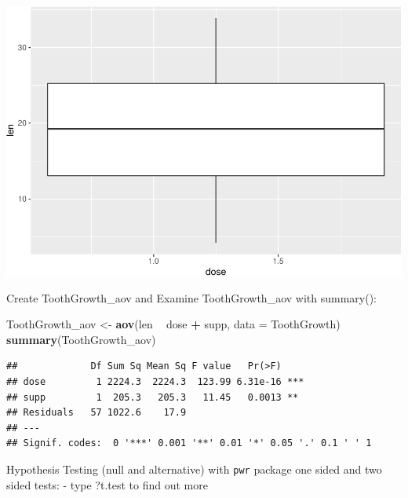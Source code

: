 \documentclass[]{book}
\newenvironment{Shaded}{\begin{snugshade}}{\end{snugshade}}
\newcommand{\CommentTok}[1]{\textcolor[rgb]{0.56,0.35,0.01}{\textit{#1}}}
\newcommand{\DataTypeTok}[1]{\textcolor[rgb]{0.13,0.29,0.53}{#1}}
\newcommand{\DecValTok}[1]{\textcolor[rgb]{0.00,0.00,0.81}{#1}}
\newcommand{\KeywordTok}[1]{\textcolor[rgb]{0.13,0.29,0.53}{\textbf{#1}}}
\newcommand{\NormalTok}[1]{#1}
\newcommand{\OperatorTok}[1]{\textcolor[rgb]{0.81,0.36,0.00}{\textbf{#1}}}
\newcommand{\StringTok}[1]{\textcolor[rgb]{0.31,0.60,0.02}{#1}}
\begin{document}
\includegraphics{code4stem_files/figure-latex/Visualize-1.pdf}

Create ToothGrowth\_aov and
Examine ToothGrowth\_aov with summary():

\begin{Shaded}
\begin{Highlighting}[]
\NormalTok{ToothGrowth_aov <-}\StringTok{ }\KeywordTok{aov}\NormalTok{(len }\OperatorTok{~}\StringTok{ }\NormalTok{dose }\OperatorTok{+}\StringTok{ }\NormalTok{supp, }\DataTypeTok{data =}\NormalTok{ ToothGrowth)}
\KeywordTok{summary}\NormalTok{(ToothGrowth_aov)}
\end{Highlighting}
\end{Shaded}

\begin{verbatim}
##             Df Sum Sq Mean Sq F value   Pr(>F)    
## dose         1 2224.3  2224.3  123.99 6.31e-16 ***
## supp         1  205.3   205.3   11.45   0.0013 ** 
## Residuals   57 1022.6    17.9                     
## ---
## Signif. codes:  0 '***' 0.001 '**' 0.01 '*' 0.05 '.' 0.1 ' ' 1
\end{verbatim}

Hypothesis Testing (null and alternative) with \texttt{pwr} package
one sided and two sided tests:
- type ?t.test to find out more

\begin{Shaded}
\end{Shaded}
\end{document}
